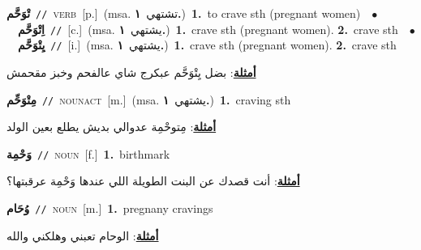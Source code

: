 \documentclass[10pt,a4paper,twoside]{article} %
\begin{document}
\begin{multicols}{2}
{\setlength\topsep{0pt}\textbf{\foreignlanguage{arabic}{تْوَحَّم}}\ {\color{gray}\texttt{//}\color{black}}\ \textsc{verb}\ [p.]\ \color{gray}(msa. \foreignlanguage{arabic}{تشتهي}~\foreignlanguage{arabic}{\textbf{١.}})\color{black}\ \textbf{1.}~to crave sth (pregnant women)\ \ $\bullet$\ \ \setlength\topsep{0pt}\textbf{\foreignlanguage{arabic}{اِتْوَحَّم}}\ {\color{gray}\texttt{//}\color{black}}\ [c.]\ \color{gray}(msa. \foreignlanguage{arabic}{يشتهي}~\foreignlanguage{arabic}{\textbf{١.}})\color{black}\ \textbf{1.}~crave sth (pregnant women).  \textbf{2.}~crave sth\ \ $\bullet$\ \ \setlength\topsep{0pt}\textbf{\foreignlanguage{arabic}{يِتْوَحَّم}}\ {\color{gray}\texttt{//}\color{black}}\ [i.]\ \color{gray}(msa. \foreignlanguage{arabic}{يشتهي}~\foreignlanguage{arabic}{\textbf{١.}})\color{black}\ \textbf{1.}~crave sth (pregnant women).  \textbf{2.}~crave sth\  \begin{flushright}\color{gray}\foreignlanguage{arabic}{\textbf{\underline{\foreignlanguage{arabic}{أمثلة}}}: بضل يِتْوَحَّم عبكرج شاي عالفحم وخبز مقحمش}\end{flushright}\color{black}} \vspace{2mm}

{\setlength\topsep{0pt}\textbf{\foreignlanguage{arabic}{مِتْوَحِّم}}\ {\color{gray}\texttt{//}\color{black}}\ \textsc{noun\textunderscore act}\ [m.]\ \color{gray}(msa. \foreignlanguage{arabic}{يشتهي}~\foreignlanguage{arabic}{\textbf{١.}})\color{black}\ \textbf{1.}~craving sth\  \begin{flushright}\color{gray}\foreignlanguage{arabic}{\textbf{\underline{\foreignlanguage{arabic}{أمثلة}}}: مِتوحْمِة عدوالي بديش يطلع بعين الولد}\end{flushright}\color{black}} \vspace{2mm}

{\setlength\topsep{0pt}\textbf{\foreignlanguage{arabic}{وَحْمِة}}\ {\color{gray}\texttt{//}\color{black}}\ \textsc{noun}\ [f.]\ \textbf{1.}~birthmark\  \begin{flushright}\color{gray}\foreignlanguage{arabic}{\textbf{\underline{\foreignlanguage{arabic}{أمثلة}}}: أنت قصدك عن البنت الطويلة اللي عندها وَحْمِة عرقبتها؟}\end{flushright}\color{black}} \vspace{2mm}

{\setlength\topsep{0pt}\textbf{\foreignlanguage{arabic}{وُحَام}}\ {\color{gray}\texttt{//}\color{black}}\ \textsc{noun}\ [m.]\ \textbf{1.}~pregnany cravings\  \begin{flushright}\color{gray}\foreignlanguage{arabic}{\textbf{\underline{\foreignlanguage{arabic}{أمثلة}}}: الوحام تعبني وهلكني والله}\end{flushright}\color{black}} \vspace{2mm}


\end{multicols}
\end{document}
